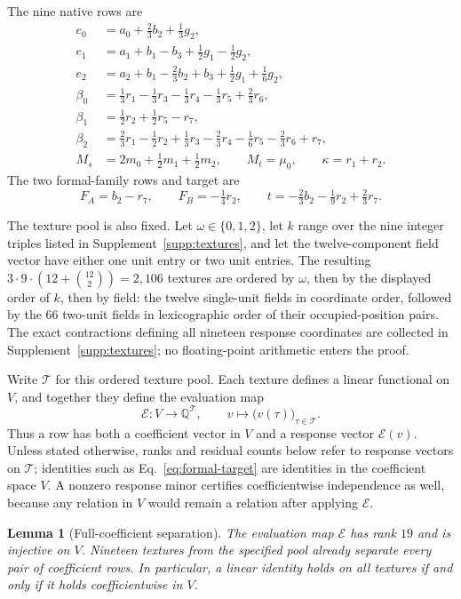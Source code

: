 \documentclass[12pt]{article}
\newtheorem{lemma}[theorem]{Lemma}
\theoremstyle{definition}
\theoremstyle{remark}
\newcommand{\QQ}{\mathbb Q}
\newcommand{\target}{t}
\begin{document}
The nine native rows are
\begin{align*}
e_0&=a_0+\tfrac23 b_2+\tfrac13 g_2,\\
e_1&=a_1+b_1-b_3+\tfrac12 g_1-\tfrac12 g_2,\\
e_2&=a_2+b_1-\tfrac23 b_2+b_3+\tfrac12 g_1+\tfrac16 g_2,\\
\beta_0&=\tfrac13r_1-\tfrac13r_3-\tfrac13r_4-\tfrac13r_5+\tfrac23r_6,\\
\beta_1&=\tfrac12r_2+\tfrac12r_5-r_7,\\
\beta_2&=\tfrac23r_1-\tfrac12r_2+\tfrac13r_3-\tfrac23r_4
          -\tfrac16r_5-\tfrac23r_6+r_7,\\
M_s&=2m_0+\tfrac12m_1+\tfrac12m_2,\qquad
M_t=\mu_0,\qquad \kappa=r_1+r_2.
\end{align*}
The two formal-family rows and target are
\begin{equation}\label{eq:formal-target}
F_A=b_2-r_7,\qquad F_B=-\tfrac14r_2,\qquad
\target=-\tfrac23b_2-\tfrac19r_2+\tfrac23r_7.
\end{equation}

The texture pool is also fixed.  Let $\omega\in\{0,1,2\}$, let $k$ range
over the nine integer triples listed in Supplement~\ref{supp:textures}, and let
the twelve-component field vector
have either one unit entry or two unit entries.  The resulting
$3\cdot9\cdot(12+\binom{12}{2})=2{,}106$ textures are ordered
by $\omega$, then by the displayed order of $k$, then by field: the twelve
single-unit fields in coordinate order, followed by the $66$ two-unit fields
in lexicographic order of their occupied-position pairs.  The exact
contractions defining all nineteen response
coordinates are collected in Supplement~\ref{supp:textures}; no floating-point
arithmetic enters the proof.

Write $\mathcal T$ for this ordered texture pool.  Each texture defines a
linear functional on $V$, and together they define the evaluation map
\[
\mathcal E:V\longrightarrow\QQ^{\mathcal T},\qquad
v\longmapsto\bigl(v(\tau)\bigr)_{\tau\in\mathcal T}.
\]
Thus a row has both a coefficient vector in $V$ and a response vector
$\mathcal E(v)$.  Unless stated otherwise, ranks and residual counts below
refer to response vectors on $\mathcal T$; identities such as
Eq.~\eqref{eq:formal-target} are identities in the coefficient space $V$.
A nonzero response minor certifies coefficientwise independence as well,
because any relation in $V$ would remain a relation after applying
$\mathcal E$.

\begin{lemma}[Full-coefficient separation]\label{lem:full-separation}
The evaluation map $\mathcal E$ has rank $19$ and is injective on $V$.
Nineteen textures from the specified pool already separate every pair of
coefficient rows.  In particular, a linear identity holds on all textures
if and only if it holds coefficientwise in $V$.
\end{lemma}
\end{document}
